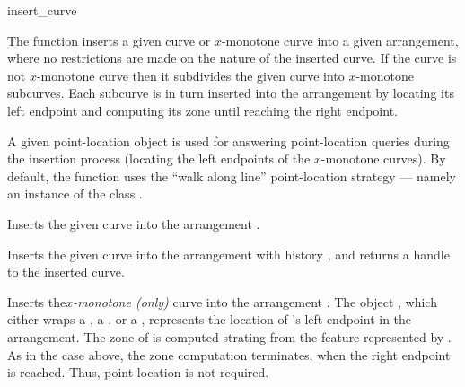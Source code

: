\ccRefPageBegin

\begin{ccRefFunction}{insert_curve}

\ccDefinition

The function \ccRefName{} inserts a given curve or $x$-monotone curve
into a given arrangement, where no restrictions are made on the nature
of the inserted curve. If the curve is not $x$-monotone curve then it
subdivides the given curve into $x$-monotone subcurves. Each subcurve
is in turn inserted into the arrangement by locating its left endpoint
and computing its zone until reaching the right endpoint.

A given point-location object is used for answering point-location
queries during the insertion process (locating the left endpoints of
the $x$-monotone curves). By default, the function uses the ``walk
along line'' point-location strategy --- namely an instance of the
class
.



Inserts the given curve  into the arrangement .




Inserts the given curve  into the arrangement with history
, and returns a handle to the inserted curve.

Inserts the{\em $x$-monotone (only)} curve  into the
arrangement . The object , which either
wraps a , a , or a
, represents the location of 's left
endpoint in the arrangement. The zone of  is computed strating
from the feature represented by . As in the case above, the
zone computation terminates, when the right endpoint is reached.
Thus, point-location is not required. 


\end{ccRefFunction}
